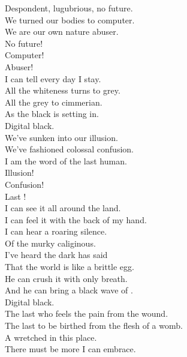 Despondent, lugubrious, no future. \\
We turned our bodies to computer. \\
We are our own nature abuser. \\

No future! \\
Computer! \\
Abuser! \\

I can tell every day I stay. \\
All the whiteness turns to grey. \\
All the grey to cimmerian. \\
As the black is setting in. \\

Digital black. \\

We've sunken into our illusion. \\
We've fashioned colossal confusion. \\
I am the word of the last human. \\

Illusion! \\
Confusion! \\
Last ! \\

I can see it all around the land. \\
I can feel it with the back of my hand. \\
I can hear a roaring silence. \\
Of the murky caliginous. \\

I've heard the dark  has said \\
That the world is like a brittle egg. \\
He can crush it with only breath. \\
And he can bring a black wave of . \\

Digital black. \\

The last who feels the pain from the wound. \\
The last to be birthed from the flesh of a womb. \\

A wretched  in this  place. \\
There must be more I can embrace. \\

